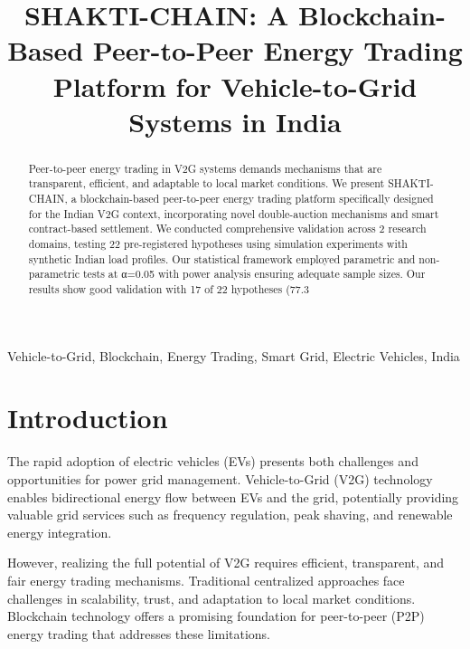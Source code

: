 \documentclass[conference]{IEEEtran}
\begin{document}
\title{SHAKTI-CHAIN: A Blockchain-Based Peer-to-Peer Energy Trading Platform for Vehicle-to-Grid Systems in India}

\author{}

\maketitle

\begin{abstract}
Peer-to-peer energy trading in V2G systems demands mechanisms that are transparent, efficient, and adaptable to local market conditions. We present SHAKTI-CHAIN, a blockchain-based peer-to-peer energy trading platform specifically designed for the Indian V2G context, incorporating novel double-auction mechanisms and smart contract-based settlement. We conducted comprehensive validation across 2 research domains, testing 22 pre-registered hypotheses using simulation experiments with synthetic Indian load profiles. Our statistical framework employed parametric and non-parametric tests at α=0.05 with power analysis ensuring adequate sample sizes. Our results show good validation with 17 of 22 hypotheses (77.3%
\end{abstract}

\begin{IEEEkeywords}
Vehicle-to-Grid, Blockchain, Energy Trading, Smart Grid, Electric Vehicles, India
\end{IEEEkeywords}

\section{Introduction}\label{sec:introduction}

The rapid adoption of electric vehicles (EVs) presents both challenges and
opportunities for power grid management. Vehicle-to-Grid (V2G) technology
enables bidirectional energy flow between EVs and the grid, potentially
providing valuable grid services such as frequency regulation, peak shaving,
and renewable energy integration.

However, realizing the full potential of V2G requires efficient, transparent,
and fair energy trading mechanisms. Traditional centralized approaches face
challenges in scalability, trust, and adaptation to local market conditions.
Blockchain technology offers a promising foundation for peer-to-peer (P2P)
energy trading that addresses these limitations.
\end{document}
